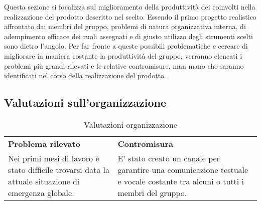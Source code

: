 Questa sezione si focalizza sul miglioramento della produttività dei  coinvolti nella
realizzazione del prodotto descritto nel  scelto. Essendo il primo progetto realistico affrontato dai membri del gruppo, problemi di natura organizzativa interna, di adempimento efficace
dei ruoli assegnati e di giusto utilizzo degli strumenti scelti sono dietro l’angolo. Per far fronte a queste
possibili problematiche e cercare di migliorare in maniera costante la produttività del gruppo, verranno elencati i problemi più grandi rilevati e le relative contromisure, man mano che saranno identificati
nel corso della realizzazione del prodotto.

\subsection{Valutazioni sull'organizzazione}
\begin{table} [h!]
	\begin{center}
		\begin{tabular} { m{8cm} m{8cm}  }
			\rowcolor{lightgray}
			\textbf{Problema rilevato} & \textbf{Contromisura}\\
			Nei primi mesi di lavoro è stato difficile trovarsi data la attuale situazione di emergenza globale. & E' stato creato un canale \glock{discord} per garantire una comunicazione testuale e vocale costante tra alcuni o tutti i membri del gruppo.
			
		\end{tabular}
	\end{center}
	\caption{Valutazioni organizzazione}
\end{table}

